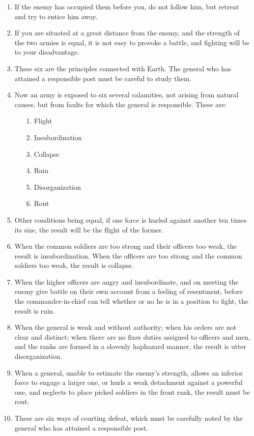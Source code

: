 \documentclass[oneside]{book}
\begin{document}
\begin{enumerate}
	\item If the enemy has occupied them before you, do not follow him, but retreat and try to entice him away.
	\item If you are situated at a great distance from the enemy, and the strength of the two armies is equal, it is not easy to provoke a battle, and fighting will be to your disadvantage.
	\item These six are the principles connected with Earth. The general who has attained a responsible post must be careful to study them.
	\item Now an army is exposed to six several calamities, not arising from natural causes, but from faults for which the general is responsible. These are:
	\begin{enumerate}
	    \item[1.] Flight
	    \item[2.] Insubordination
	    \item[3.] Collapse
	    \item[4.] Ruin
	    \item[5.] Disorganization
	    \item[6.] Rout
	\end{enumerate}
	\item Other conditions being equal, if one force is hurled against another ten times its size, the result will be the flight of the former.
	\item When the common soldiers are too strong and their officers too weak, the result is insubordination. When the officers are too strong and the common soldiers too weak, the result is collapse.
	\item When the higher officers are angry and insubordinate, and on meeting the enemy give battle on their own account from a feeling of resentment, before the commander-in-chief can tell whether or no he is in a position to fight, the result is ruin.
	\item When the general is weak and without authority; when his orders are not clear and distinct; when there are no fixes duties assigned to officers and men, and the ranks are formed in a slovenly haphazard manner, the result is utter disorganization.
	\item When a general, unable to estimate the enemy's strength, allows an inferior force to engage a larger one, or hurls a weak detachment against a powerful one, and neglects to place picked soldiers in the front rank, the result must be rout.
	\item These are six ways of courting defeat, which must be carefully noted by the general who has attained a responsible post.

\end{enumerate}
\end{document}
